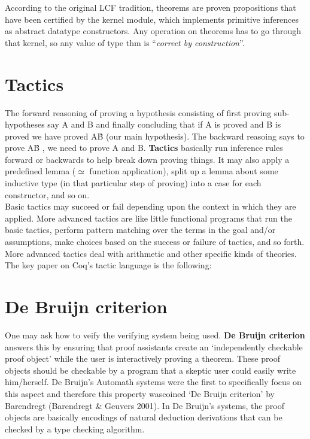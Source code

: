 According to the original LCF tradition, theorems are proven propositions that have been certified by the kernel module, which implements primitive inferences as abstract datatype constructors. Any operation on theorems has to go through that kernel, so any value of type thm is “\textit{correct by construction}”.

\section{Tactics}
The forward reasoning of proving a hypothesis consisting of first proving sub-hypotheses say A and B and finally concluding that if A is proved and B is proved we have proved A\^B (our main hypothesis). The backward reasoing says to prove A\^B , we need to prove A and B. \textbf{Tactics} basically run inference rules forward or backwards to help break down proving things. It may also apply a predefined lemma ($\simeq$ function application), split up a lemma about some inductive type (in that particular step of proving) into a case for each constructor, and so on. \\

Basic tactics may succeed or fail depending upon the context in which they are applied. More advanced tactics are like little functional programs that run the basic tactics, perform pattern matching over the terms in the goal and/or assumptions, make choices based on the success or failure of tactics, and so forth. More advanced tactics deal with arithmetic and other specific kinds of theories. The key paper on Coq's tactic language is the following:

\section{De Bruijn criterion}
One may ask how to veify the verifying system being used. \textbf{De Bruijn criterion}  answers this by ensuring that proof assistants create an ‘independently checkable proof object’ while the user is interactively proving a theorem. These proof objects should be checkable by a program that a skeptic user could easily write him/herself. De Bruijn’s Automath systems were the first to specifically focus on this aspect and therefore this property wascoined ‘De Bruijn criterion’ by Barendregt (Barendregt \& Geuvers 2001). In De Bruijn’s systems, the proof objects are basically encodings of natural deduction derivations that can be checked by a type checking algorithm.\\

